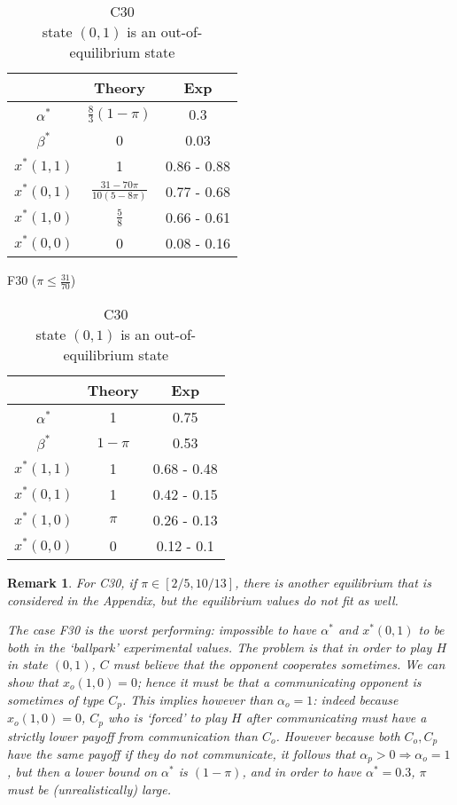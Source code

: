 \documentclass[12pt]{article}
\newtheorem{remark}{Remark}
\begin{document}
\begin{table}[h!]
	\begin{subtable}[]{0.45\linewidth}
		{\renewcommand{\arraystretch}{1.2}%
		\begin{tabular}{c c c}
			& Theory 	& Exp \\
			\hline 
			$\alpha^*$ 	& $\frac{8}{3}(1-\pi)$	& 0.3\\
			$\beta^*$ 	& 0 & 0.03\\ 
			\hline
			$x^*(1,1)$ 	& 1	& 0.86 - 0.88\\ 
			$x^*(0,1)$ & $\frac{31-70\pi}{10(5-8\pi)}$ & 0.77 - 0.68\\ 
			$x^*(1,0)$ & $\frac{5}{8}$ & 0.66 - 0.61\\
			$x^*(0,0)$ & 0 &  0.08 - 0.16\\
				\hline
		\end{tabular}
		\caption*{F30 ($\pi\leq \frac{31}{70}$)}}
	\end{subtable}
	\hfill
	\begin{subtable}[]{0.45\linewidth}
		{\renewcommand{\arraystretch}{1.2}%
			\begin{tabular}{c c c}
					& Theory 	& Exp \\
					\hline
					$\alpha^*$ 	& 1	& 0.75\\
					$\beta^*$ 	& $1-\pi$ & 0.53\\ 
					\hline
					$x^*(1,1)$ 	& 1	& 0.68 - 0.48\\
					$x^*(0,1)$ & 1 & 0.42 - 0.15\\ 
					$x^*(1,0)$ & $\pi$ & 0.26 - 0.13\\
					$x^*(0,0)$ & 0 &  0.12 - 0.1\\
						\hline
			\end{tabular}}
				\caption*{C30\\{\tiny state $(0,1)$ is an out-of-equilibrium state}} 
	\end{subtable}
	\end{table}



\begin{remark}
	For C30, if $\pi\in[2/5,10/13]$, there is another equilibrium that is considered in the Appendix, but the equilibrium values do not fit as well.
	
	The case F30 is the worst performing: impossible to have $\alpha^*$ and $x^*(0,1)$ to be both in the `ballpark' experimental values. The problem is that in order to play $H$ in state $(0,1)$, $C$ must believe that the opponent cooperates sometimes. We can show that $x_o(1,0)=0$; hence it must be that a communicating opponent is sometimes of type $C_p$. This implies however than $\alpha_o=1$: indeed because $x_o(1,0)=0$, $C_p$ who is `forced' to play $H$ after communicating must have a strictly lower payoff from communication than $C_o$. However because both $C_o,C_p$ have the same payoff if they do not communicate, it follows that $\alpha_p>0 \Rightarrow \alpha_o=1$, but then a lower bound on $\alpha^*$ is $(1-\pi)$, and in order to have $\alpha^*=0.3$, $\pi$ must be (unrealistically) large.
\end{remark}
\end{document}
